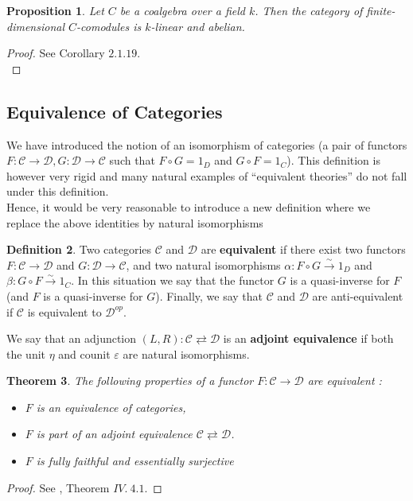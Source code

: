 \documentclass{article}
\theoremstyle{plain}
\newtheorem{theorem}{Theorem}[subsection]
\newtheorem{proposition}[theorem]{Proposition}
\theoremstyle{definition}
\newtheorem{definition}[theorem]{Definition}
\begin{document}
\begin{proposition}
\label{comodules_abelian}
    Let $C$ be a coalgebra over a field $k$. Then the category of finite-dimensional $C$-comodules is $k$-linear and abelian.
\end{proposition}
\begin{proof}
    See \cite{DNR} Corollary $2.1.19$.\\
\end{proof}


\subsection{Equivalence of Categories}
We have introduced the notion of an isomorphism of categories (a pair of functors $F :\mathcal{C}\rightarrow\mathcal{D}, G: \mathcal{D}\rightarrow\mathcal{C}$ such that $F\circ G= 1_D$ and $G\circ F = 1_C$). This definition is however very rigid and many natural examples of “equivalent theories” do not fall under this definition.\\
Hence, it would be very reasonable to introduce a new definition where we replace the above identities by natural isomorphisms
\begin{definition}
    Two categories $\mathcal{C}$ and $\mathcal{D}$ are \textbf{equivalent} if there exist two functors $F : \mathcal{C}\rightarrow\mathcal{D}$ and $G: \mathcal{D}\rightarrow\mathcal{C}$, and two natural isomorphisms $\alpha:F\circ G \xrightarrow{\sim} 1_D$ and $\beta : G\circ F \xrightarrow{\sim} 1_C$. In this situation we say that the functor $G$ is a quasi-inverse for $F$ (and $F$ is a quasi-inverse for $G$).
    Finally, we say that $\mathcal{C}$ and $\mathcal{D}$ are anti-equivalent if $\mathcal{C}$ is equivalent to $\mathcal{D}^{op}$.
\end{definition}

\noindent We say that an adjunction $(L,R):\mathcal{C}\rightleftarrows\mathcal{D}$ is an \textbf{adjoint equivalence} if both the unit $\eta$ and counit $\varepsilon$ are natural isomorphisms.

\begin{theorem}
    The following properties of a functor $F:\mathcal{C}\rightarrow \mathcal{D}$ are equivalent :
    \begin{itemize}
        \item[$a)$] $F$ is an equivalence of categories,
        \item[$b)$] $F$ is part of an adjoint equivalence $\mathcal{C}\rightleftarrows\mathcal{D}$.
        \item[$c)$] $F$ is fully faithful and essentially surjective
    \end{itemize}
\end{theorem}
\begin{proof}
    See \cite{McLane_Sau}, Theorem $IV.\:4.1.$
\end{proof}
\end{document}
